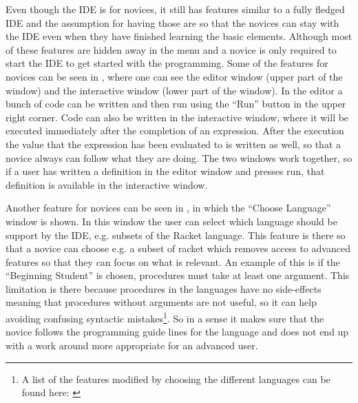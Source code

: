 Even though the IDE is for novices, it still has features similar to a fully fledged IDE and the assumption for having those are so that the novices can stay with the IDE even when they have finished learning the basic elements. Although most of these features are hidden away in the menu and a novice is only required to start the IDE to get started with the programming. Some of the features for novices can be seen in , where one can see the editor window (upper part of the window) and the interactive window (lower part of the window). In the editor a bunch of code can be written and then run using the ``Run'' button in the upper right corner. Code can also be written in the interactive window, where it will be executed immediately after the completion of an expression. After the execution the value that the expression has been evaluated to is written as well, so that a novice always can follow what they are doing. The two windows work together, so if a user has written a definition in the editor window and presses run, that definition is available in the interactive window.

Another feature for novices can be seen in , in which the ``Choose Language'' window is shown. In this window the user can select which language should be support by the IDE, e.g. subsets of the Racket language. This feature is there so that a novice can choose e.g. a subset of racket which removes access to advanced features so that they can focus on what is relevant. An example of this is if the ``Beginning Student'' is chosen, procedures must take at least one argument. This limitation is there because procedures in the languages have no side-effects meaning that procedures without arguments are not useful, so it can help avoiding confusing syntactic mistakes\cite{dr_racket_languages}\footnote{A list of the features modified by choosing the different languages can be found here: \cite{dr_racket_languages}}. So in a sense it makes sure that the novice follows the programming guide lines for the language and does not end up with a work around more appropriate for an advanced user.

